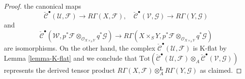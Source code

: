 \begin{proof}
the canonical maps
$$
\check{\mathcal{C}}^\bullet(\mathcal{U}, \mathcal{F})
\to
R\Gamma(X, \mathcal{F}),
\quad
\check{\mathcal{C}}^\bullet(\mathcal{V}, \mathcal{G})
\to
R\Gamma(Y, \mathcal{G})
$$
and
$$
\check{\mathcal{C}}^\bullet(\mathcal{W},
p^*\mathcal{F} \otimes_{\mathcal{O}_{X \times_S Y}} q^*\mathcal{G})
\to
R\Gamma(X \times_S Y,
p^*\mathcal{F} \otimes_{\mathcal{O}_{X \times_S Y}}
q^*\mathcal{G})
$$
are isomorphisms. On the other hand, the complex
$\check{\mathcal{C}}^\bullet(\mathcal{U}, \mathcal{F})$
is K-flat by Lemma \ref{lemma-K-flat} and we conclude that
$\text{Tot}(
\check{\mathcal{C}}^\bullet(\mathcal{U}, \mathcal{F})
\otimes_A
\check{\mathcal{C}}^\bullet(\mathcal{V}, \mathcal{G}))$
represents the derived tensor product
$R\Gamma(X, \mathcal{F}) \otimes_A^\mathbf{L} R\Gamma(Y, \mathcal{G})$
as claimed.


\end{proof}
